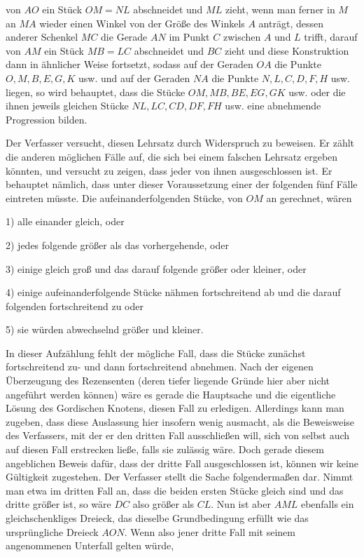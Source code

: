 %
von \(AO\) ein Stück \(OM=NL\) abschneidet und \(ML\) zieht, wenn man ferner in \(M\) an \(MA\) wieder einen Winkel von der Größe des Winkels \(A\) anträgt, dessen anderer Schenkel \(MC\) die Gerade \(AN\) im Punkt \(C\) zwischen \(A\) und \(L\) trifft, darauf von \(AM\) ein Stück \(MB=LC\) abschneidet und \(BC\) zieht und diese Konstruktion dann in ähnlicher Weise fortsetzt, sodass auf der Geraden \(OA\) die Punkte \(O,M,B,E,G,K\) usw. und auf der Geraden \(NA\) die Punkte \(N,L,C,D,F,H\) usw. liegen, so wird behauptet, dass die Stücke \(OM,MB,BE,EG,GK\) usw. oder die ihnen jeweils gleichen Stücke \(NL,LC,CD,DF,FH\) usw. eine abnehmende Progression bilden.

Der Verfasser versucht, diesen Lehrsatz durch Widerspruch zu beweisen. Er zählt die anderen möglichen Fälle auf, die sich bei einem falschen Lehrsatz ergeben könnten, und versucht zu zeigen, dass jeder von ihnen ausgeschlossen ist. Er behauptet nämlich, dass unter dieser Voraussetzung einer der folgenden fünf Fälle eintreten müsste. Die aufeinanderfolgenden Stücke, von \(OM\) an gerechnet, wären
\par\noindent\hspace*{\parindent}1) alle einander gleich, oder
\par\noindent\hspace*{\parindent}2) jedes folgende größer als das vorhergehende, oder
\par\noindent\hspace*{\parindent}3) einige gleich groß und das darauf folgende größer oder kleiner, oder
\par\noindent\hspace*{\parindent}4) einige aufeinanderfolgende Stücke nähmen fortschreitend ab und die darauf folgenden fortschreitend zu oder
\par\noindent\hspace*{\parindent}5) sie würden abwechselnd größer und kleiner.
\par\noindent In dieser Aufzählung fehlt der mögliche Fall, dass die Stücke zunächst fortschreitend zu- und dann fortschreitend abnehmen. Nach der eigenen Überzeugung des Rezensenten (deren tiefer liegende Gründe hier aber nicht angeführt werden können) wäre es gerade die Hauptsache und die eigentliche Lösung des Gordischen Knotens, diesen Fall zu erledigen. Allerdings kann man zugeben, dass diese Auslassung hier insofern wenig ausmacht, als die Beweisweise des Verfassers, mit der er den dritten Fall ausschließen will, sich von selbst auch auf diesen Fall erstrecken ließe, falls sie zulässig wäre. Doch gerade diesem angeblichen Beweis dafür, dass der dritte Fall ausgeschlossen ist, können wir keine Gültigkeit zugestehen. Der Verfasser stellt die Sache folgendermaßen dar. Nimmt man etwa im dritten Fall an, dass die beiden ersten Stücke gleich sind und das dritte größer ist, so wäre \(DC\) also größer als \(CL\). Nun ist aber \(AML\) ebenfalls ein gleichschenkliges Dreieck, das dieselbe Grundbedingung erfüllt wie das ursprüngliche Dreieck \(AON\). Wenn also jener dritte Fall mit seinem angenommenen Unterfall gelten würde,
